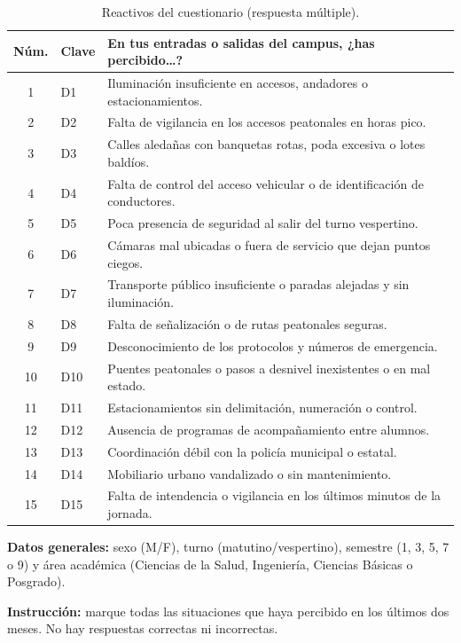 \documentclass[11pt,a4paper]{article}
\begin{document}
\begin{table}[H]
\centering
\small
\caption{Reactivos del cuestionario (respuesta múltiple).}
\label{tab:cuestionario}
\begin{tabularx}{\linewidth}{@{}clX@{}}
\toprule
\textbf{Núm.} & \textbf{Clave} & \textbf{En tus entradas o salidas del campus, ¿has percibido\ldots?} \\
\midrule
1  & D1  & Iluminación insuficiente en accesos, andadores o estacionamientos. \\
2  & D2  & Falta de vigilancia en los accesos peatonales en horas pico. \\
3  & D3  & Calles aledañas con banquetas rotas, poda excesiva o lotes baldíos. \\
4  & D4  & Falta de control del acceso vehicular o de identificación de conductores. \\
5  & D5  & Poca presencia de seguridad al salir del turno vespertino. \\
6  & D6  & Cámaras mal ubicadas o fuera de servicio que dejan puntos ciegos. \\
7  & D7  & Transporte público insuficiente o paradas alejadas y sin iluminación. \\
8  & D8  & Falta de señalización o de rutas peatonales seguras. \\
9  & D9  & Desconocimiento de los protocolos y números de emergencia. \\
10 & D10 & Puentes peatonales o pasos a desnivel inexistentes o en mal estado. \\
11 & D11 & Estacionamientos sin delimitación, numeración o control. \\
12 & D12 & Ausencia de programas de acompañamiento entre alumnos. \\
13 & D13 & Coordinación débil con la policía municipal o estatal. \\
14 & D14 & Mobiliario urbano vandalizado o sin mantenimiento. \\
15 & D15 & Falta de intendencia o vigilancia en los últimos minutos de la jornada. \\
\bottomrule
\end{tabularx}
\end{table}

\noindent\textbf{Datos generales:} sexo (M/F), turno (matutino/vespertino),
semestre (1, 3, 5, 7 o 9) y área académica (Ciencias de la Salud, Ingeniería, Ciencias
Básicas o Posgrado).

\noindent\textbf{Instrucción:} marque todas las situaciones que haya percibido
en los últimos dos meses. No hay respuestas correctas ni incorrectas.
\end{document}
